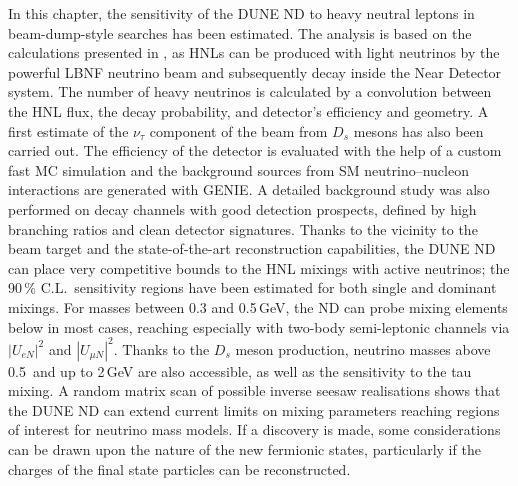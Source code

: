 In this chapter, the sensitivity of the DUNE ND to heavy neutral leptons in beam-dump-style searches has been estimated.
The analysis is based on the calculations presented in , %
as HNLs can be produced with light neutrinos by the powerful LBNF neutrino beam 
and subsequently decay inside the Near Detector system.
The number of heavy neutrinos is calculated by a convolution between the HNL flux, the decay probability, %
and detector's efficiency and geometry.
A first estimate of the $\nu_\tau$ component of the beam from $D_s$ mesons has also been carried out.
The efficiency of the detector is evaluated with the help of a custom fast MC simulation %
and the background sources from SM neutrino--nucleon interactions are generated with GENIE.
A detailed background study was also performed on decay channels with good detection prospects, %
defined by high branching ratios and clean detector signatures.
Thanks to the vicinity to the beam target and the state-of-the-art reconstruction capabilities, %
the DUNE ND can place very competitive bounds to the HNL mixings with active neutrinos;
the 90\,\% C.L.\ sensitivity regions have been estimated for both single and dominant mixings.
For masses between 0.3 and 0.5\,GeV, the ND can probe mixing elements below  in most cases, %
reaching  especially with two-body semi-leptonic channels via $|U_{e N}|^2$ and $|U_{\mu N}|^2$.
Thanks to the $D_s$ meson production, neutrino masses above 0.5\, and up to 2\,GeV are also accessible, %
as well as the sensitivity to the tau mixing.
A random matrix scan of possible inverse seesaw realisations shows that the DUNE ND %
can extend current limits on mixing parameters reaching regions of interest for neutrino mass models.
If a discovery is made, some considerations can be drawn upon the nature of the new fermionic states, %
particularly if the charges of the final state particles can be reconstructed.

